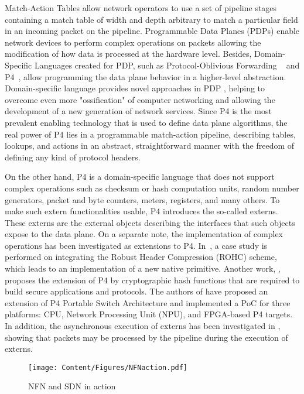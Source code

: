 Match-Action Tables allow network operators to use a set of pipeline stages containing a match table of width and depth arbitrary to match a particular field in an incoming packet on the pipeline. Programmable Data Planes (PDPs) enable network devices to perform complex operations on packets allowing the modification of how data is processed at the hardware level. Besides, Domain-Specific Languages created for PDP, such as Protocol-Oblivious Forwarding ~\cite{song2013protocol} and P4~\cite{bosshart2014p4}, allow programming the data plane behavior in a higher-level abstraction. Domain-specific language provides novel approaches in PDP \cite{da2017data}, helping to overcome even more  "ossification" of computer networking and allowing the development of a new generation of network services. Since P4 is the most prevalent enabling technology that is used to define data plane algorithms, the real power of P4 lies in a programmable match-action pipeline, describing tables, lookups, and actions in an abstract, straightforward manner with the freedom of defining any kind of protocol headers.

On the other hand, P4 is a domain-specific language that does not support complex operations such as checksum or hash computation units, random number generators, packet and byte counters, meters, registers, and many others. To make such extern functionalities usable, P4 introduces the so-called externs. These externs are  the external objects describing the interfaces that such objects expose to the data plane. On a separate note, the implementation of complex operations has been investigated as extensions to P4. In~\cite{da2018extern}, a case study is performed on integrating the Robust Header Compression (ROHC) scheme, which leads to an implementation of a new native primitive. Another work, \cite{scholz2019cryptographic}, proposes the extension of P4 by cryptographic hash functions that are required to build secure applications and protocols. The authors of \cite{scholz2019cryptographic} have proposed an extension of P4 Portable Switch Architecture and implemented a PoC for three platforms: CPU, Network Processing Unit (NPU), and FPGA-based P4 targets. In addition, the asynchronous execution of externs has been investigated in \cite{laki2020price, horpacsi2019asynchronous}, showing that packets may be processed by the pipeline during the execution of externs.

\begin{figure}[h]
\texttt{[image: Content/Figures/NFNaction.pdf]}
\caption{NFN and SDN in action}
\label{fig:NFN}
\end{figure}
